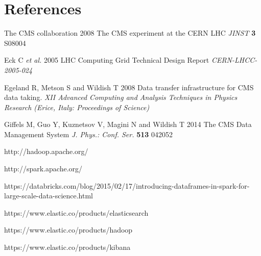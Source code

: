 \documentclass[a4paper]{jpconf}
\begin{document}
\section*{References}
\medskip
\begin{thebibliography}{9}
\item The CMS collaboration 2008 The CMS experiment at the CERN LHC {\it JINST} {\bf 3} S08004
\item Eck C {\it et al.} 2005 LHC Computing Grid Technical Design Report {\it CERN-LHCC-2005-024}
\item Egeland R, Metson S and Wildish T 2008 Data transfer infrastructure for CMS data taking. {\it XII Advanced Computing and Analysis Techniques in Physics Research (Erice, Italy: 
Proceedings of Science)}
\item Giffels M, Guo Y, Kuznetsov V, Magini N and Wildish T 2014 The CMS Data Management System {\it J. Phys.: Conf. Ser.} {\bf 513} 042052 
\item http://hadoop.apache.org/ 
\item http://spark.apache.org/
\item https://databricks.com/blog/2015/02/17/introducing-dataframes-in-spark-for-large-scale-data-science.html
\item https://www.elastic.co/products/elasticsearch
\item https://www.elastic.co/products/hadoop 
\item https://www.elastic.co/products/kibana
\end{thebibliography}
\smallskip
\end{document}
